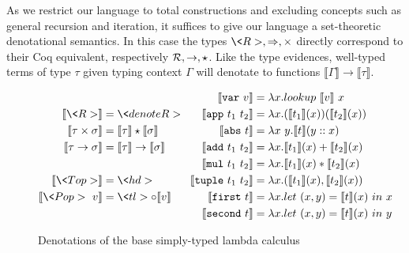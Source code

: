   As we restrict our language to total constructions and excluding concepts such as general recursion and iteration, it suffices to give our language a set-theoretic denotational semantics.
  In this case the types $\<R>, \Rightarrow, \times$ directly correspond to their Coq equivalent, respectively $\mathcal{R}, \rightarrow, \star$.
  Like the type evidences, well-typed terms of type $\tau$ given typing context $\Gamma$ will denotate to functions $\llbracket \Gamma \rrbracket \rightarrow \llbracket \tau \rrbracket$.

  \begin{figure}
    \centering
    \begin{equation*}
      \begin{split}
        \llbracket \<R> \rrbracket &= \<denoteR> \\
        \llbracket \tau \times \sigma \rrbracket &=
          \llbracket \tau \rrbracket \star \llbracket \sigma \rrbracket \\
        \llbracket \tau \rightarrow \sigma \rrbracket &= \llbracket \tau \rrbracket \rightarrow \llbracket \sigma \rrbracket \\
        \\
        \llbracket \<Top> \rrbracket &= \<hd> \\
        \llbracket \<Pop>\ v \rrbracket &= \<tl> \circ \llbracket v \rrbracket \\
      \end{split}
      \;\;\;
      \begin{split}
        \llbracket \var{v} \rrbracket &=
          \lambda x. lookup\ \llbracket v \rrbracket\ x \\
        \llbracket \app{t_1}{t_2} \rrbracket &=
          \lambda x. (\llbracket t_1 \rrbracket(x)) (\llbracket t_2 \rrbracket(x)) \\
        \llbracket \abs{t} \rrbracket &=
          \lambda x\ y. \llbracket t \rrbracket(y :: x) \\
        \llbracket \add{t_1}{t_2} \rrbracket &=
          \lambda x. \llbracket t_1 \rrbracket(x) + \llbracket t_2 \rrbracket(x) \\
        \llbracket \mul{t_1}{t_2} \rrbracket &=
          \lambda x. \llbracket t_1 \rrbracket(x) * \llbracket t_2 \rrbracket(x) \\
        \llbracket \tuple{t_1}{t_2} \rrbracket &=
          \lambda x. (\llbracket t_1 \rrbracket(x), \llbracket t_2 \rrbracket(x)) \\
        \llbracket \first{t} \rrbracket &=
          \lambda x. let\ (x, y) = \llbracket t \rrbracket(x)\ in\ x \\
        \llbracket \second{t} \rrbracket &=
          \lambda x. let\ (x, y) = \llbracket t \rrbracket(x)\ in\ y \\
      \end{split}
    \end{equation*}
    \caption{Denotations of the base simply-typed lambda calculus}
    \label{eqn:denotation_base}
  \end{figure}

